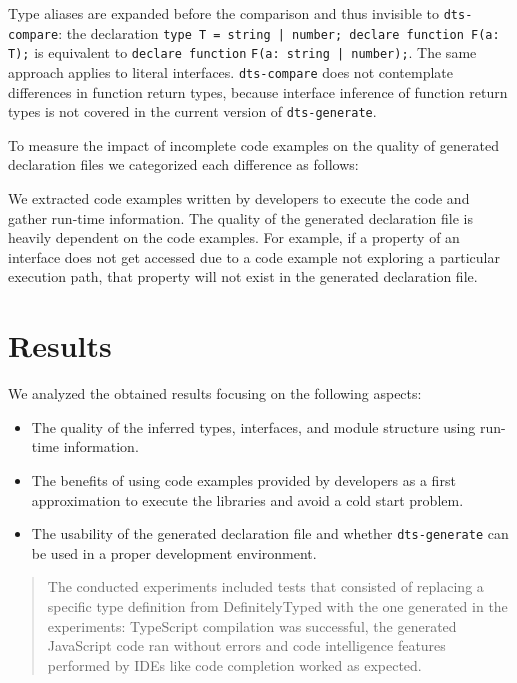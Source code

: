 \documentclass[english,cleveref,autoref,submission]{programming}
\newenvironment{changethis}{%
  \begin{tcolorbox}[breakable,notitle,boxrule=0pt,colback=blue!20,colframe=blue!20]}{%
  \end{tcolorbox}}
\begin{document}
Type aliases are expanded before the comparison and thus invisible to
\texttt{dts-compare}: the declaration
\lstinline{type T = string | number; declare function F(a: T);} is equivalent to
\lstinline{declare function} \lstinline{F(a: string | number);}. The same approach applies to literal
interfaces. \texttt{dts-compare} does 
not contemplate differences in function return types, because interface inference of
function return types is not covered in the current version of \texttt{dts-generate}. 


\begin{changethis}

To measure the impact of incomplete code examples on the
quality of generated declaration files we categorized each difference as follows: 



  We extracted code examples written by developers to execute the code
  and gather run-time information. The quality of the generated
  declaration file is heavily dependent on the code examples. For
  example, if a property of an interface does not get accessed due to
  a code example not exploring a particular execution path, that
  property will not exist in the generated declaration file.
\end{changethis}

\section{Results}
\label{sec:results}
We analyzed the obtained results focusing on the following aspects:
\begin{itemize}
  \item The quality of the inferred types, interfaces, and module structure using run-time information.
  \item The benefits of using code examples provided by developers as a first approximation to execute the libraries and avoid a cold start problem.
  \item The usability of the generated declaration file and whether \texttt{dts-generate} can be used in a proper development environment.
\end{itemize}

\begin{quotation}
  The conducted experiments included tests that consisted of replacing
  a specific type definition from DefinitelyTyped
  \cite{definitely-typed-repository} with the one generated in the
  experiments: TypeScript compilation was successful, the generated
  JavaScript code ran without errors and code intelligence features
  performed by IDEs like code completion worked as expected.
\end{quotation}
\end{document}
